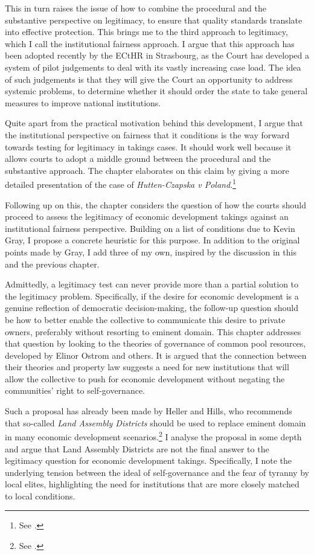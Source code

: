This in turn raises the issue of how to combine the procedural and the substantive perspective on legitimacy, to ensure that quality standards translate into effective protection. This brings me to the third approach to legitimacy, which I call the institutional fairness approach. I argue that this approach has been adopted recently by the ECtHR in Strasbourg, as the Court has developed a system of pilot judgements to deal with its vastly increasing case load. The idea of such judgements is that they will give the Court an opportunity to address systemic problems, to determine whether it should order the state to take general measures to improve national institutions.

Quite apart from the practical motivation behind this development, I argue that the institutional perspective on fairness that it conditions is the way forward towards testing for legitimacy in takings cases. It should work well because it allows courts to adopt a middle ground between the procedural and the substantive approach. The chapter elaborates on this claim by giving a more detailed presentation of the case of {\it Hutten-Czapska v Poland}.\footnote{See \cite{hutten06}.}

Following up on this, the chapter considers the question of how the courts should proceed to assess the legitimacy of economic development takings against an institutional fairness perspective. Building on a list of conditions due to Kevin Gray, I propose a concrete heuristic for this purpose. In addition to the original points made by Gray, I add three of my own, inspired by the discussion in this and the previous chapter. 

Admittedly, a legitimacy test can never provide more than a partial solution to the legitimacy problem. Specifically, if the desire for economic development is a genuine reflection of democratic decision-making, the follow-up question should be how to better enable the collective to communicate this desire to private owners, preferably without resorting to eminent domain. This chapter addresses that question by looking to the theories of governance of common pool resources, developed by Elinor Ostrom and others. It is argued that the connection between their theories and property law suggests a need for new institutions that will allow the collective to push for economic development without negating the communities' right to self-governance. 

Such a proposal has already been made by Heller and Hills, who recommends that so-called {\it Land Assembly Districts} should be used to replace eminent domain in many economic development scenarios.\footnote{See \cite{heller08}.} I analyse the proposal in some depth and argue that Land Assembly Districts are not the final answer to the legitimacy question for economic development takings. Specifically, I note the underlying tension between the ideal of self-governance and the fear of tyranny by local elites, highlighting the need for institutions that are more closely matched to local conditions.

